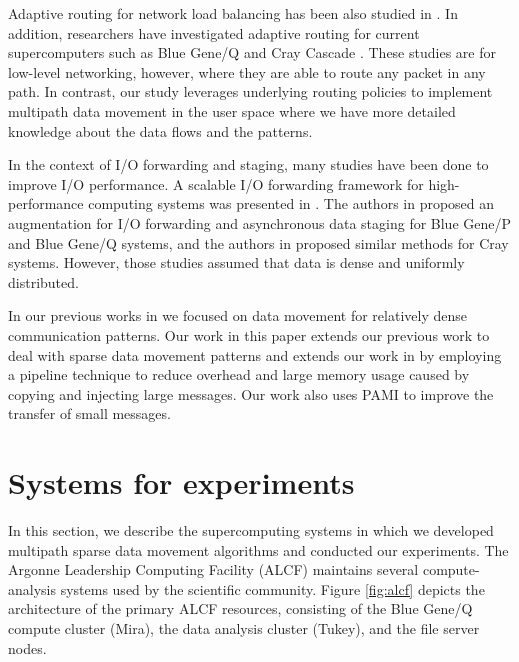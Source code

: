 \documentclass[final,5p,times]{elsarticle}
\begin{document}
Adaptive routing for network load balancing has been also studied in \cite{Valiant:Routing,singh2003:goal}. 
In addition, researchers have investigated adaptive routing for current supercomputers such as  Blue Gene/Q \cite{Chen:BGQ} and Cray Cascade \cite{garcia2013:CrayDragonfly}. These studies are for low-level networking, however, where they are able to route any packet in any path. In contrast, our study leverages underlying routing policies to implement multipath data movement in the user space where we have more detailed knowledge about the data flows and the patterns. 

In the context of I/O forwarding and staging, many studies have been done to improve I/O performance.   
A scalable I/O forwarding framework for high-performance computing systems was presented in \cite{Ali:IOForwarding,Iskra:IOForwarding}. The authors in \cite{Vishwanath:IOForwarding,Vishwanath:GLEAN} proposed an augmentation for I/O forwarding and asynchronous data staging for Blue Gene/P and Blue Gene/Q systems, and the authors in \cite{ADIOS} proposed similar methods for Cray systems. However, those studies assumed that data is dense and uniformly distributed.

In our previous works in \cite{hbui:bgq, SDAV:Bui2014b, hbui:optiq} we focused on data movement for relatively dense communication patterns. Our work in this paper extends our previous work \cite{Vishwanath:GLEAN} to deal with sparse data movement patterns and extends our work in \cite{SDAV:Bui2014b} by employing a pipeline technique to reduce overhead and large memory usage caused by copying and injecting large messages. Our work also uses PAMI to improve the transfer of small messages.

\section{Systems for experiments}
\label{sec:system}

In this section, we describe the supercomputing systems in which we developed multipath sparse data movement algorithms and conducted our experiments. The Argonne Leadership Computing Facility (ALCF) maintains several compute-analysis systems used by the scientific community. Figure \ref{fig:alcf} depicts the architecture of the primary ALCF resources, consisting of the Blue Gene/Q compute cluster (Mira), the data analysis cluster (Tukey), and the file server nodes.
\end{document}
